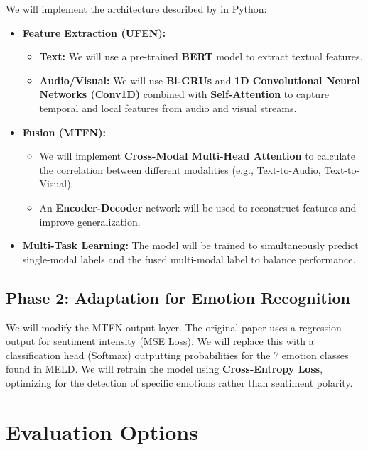 \documentclass[11pt]{article}
\begin{document}
We will implement the architecture described by \citet{cai2025multimodal} in Python:

\begin{itemize}
    \item \textbf{Feature Extraction (UFEN):}
    \begin{itemize}
        \item \textbf{Text:} We will use a pre-trained \textbf{BERT} model to extract textual features.
        \item \textbf{Audio/Visual:} We will use \textbf{Bi-GRUs} and \textbf{1D Convolutional Neural Networks (Conv1D)} combined with \textbf{Self-Attention} to capture temporal and local features from audio and visual streams.
    \end{itemize}
    
    \item \textbf{Fusion (MTFN):}
    \begin{itemize}
        \item We will implement \textbf{Cross-Modal Multi-Head Attention} to calculate the correlation between different modalities (e.g., Text-to-Audio, Text-to-Visual).
        \item An \textbf{Encoder-Decoder} network will be used to reconstruct features and improve generalization.
    \end{itemize}
    
    \item \textbf{Multi-Task Learning:} The model will be trained to simultaneously predict single-modal labels and the fused multi-modal label to balance performance.
\end{itemize}

\subsection{Phase 2: Adaptation for Emotion Recognition}

We will modify the MTFN output layer. The original paper uses a regression output for sentiment intensity (MSE Loss). We will replace this with a classification head (Softmax) outputting probabilities for the 7 emotion classes found in MELD. We will retrain the model using \textbf{Cross-Entropy Loss}, optimizing for the detection of specific emotions rather than sentiment polarity.

\section{Evaluation Options}
\end{document}
